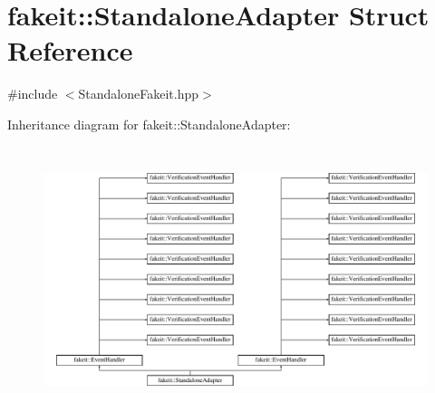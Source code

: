 \hypertarget{structfakeit_1_1StandaloneAdapter}{}\section{fakeit\+::Standalone\+Adapter Struct Reference}
\label{structfakeit_1_1StandaloneAdapter}


{\ttfamily \#include $<$Standalone\+Fakeit.\+hpp$>$}

Inheritance diagram for fakeit\+::Standalone\+Adapter\+:\begin{figure}[H]
\begin{center}
\leavevmode
\includegraphics[height=7.777778cm]{structfakeit_1_1StandaloneAdapter}
\end{center}
\end{figure}
